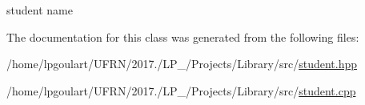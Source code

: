 student name 



The documentation for this class was generated from the following files\+:\begin{DoxyCompactItemize}
\item 
/home/lpgoulart/\+U\+F\+R\+N/2017./\+L\+P\+\_/\+Projects/\+Library/src/\hyperlink{student_8hpp}{student.\+hpp}\item 
/home/lpgoulart/\+U\+F\+R\+N/2017./\+L\+P\+\_/\+Projects/\+Library/src/\hyperlink{student_8cpp}{student.\+cpp}\end{DoxyCompactItemize}
